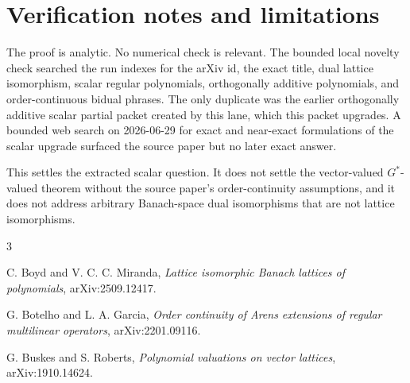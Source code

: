 \documentclass[11pt]{amsart}
\begin{document}
\section*{Verification notes and limitations}

The proof is analytic.  No numerical check is relevant.  The bounded local
novelty check searched the run indexes for the arXiv id, the exact title,
dual lattice isomorphism, scalar regular polynomials, orthogonally additive
polynomials, and order-continuous bidual phrases.  The only duplicate was the
earlier orthogonally additive scalar partial packet created by this lane,
which this packet upgrades.  A bounded web search on 2026-06-29 for exact and
near-exact formulations of the scalar upgrade surfaced the source paper but no
later exact answer.

This settles the extracted scalar question.  It does not settle the
vector-valued $G^*$-valued theorem without the source paper's
order-continuity assumptions, and it does not address arbitrary Banach-space
dual isomorphisms that are not lattice isomorphisms.

\begin{thebibliography}{3}

C. Boyd and V. C. C. Miranda,
\emph{Lattice isomorphic Banach lattices of polynomials},
arXiv:2509.12417.

G. Botelho and L. A. Garcia,
\emph{Order continuity of Arens extensions of regular multilinear operators},
arXiv:2201.09116.

G. Buskes and S. Roberts,
\emph{Polynomial valuations on vector lattices},
arXiv:1910.14624.

\end{thebibliography}
\end{document}
